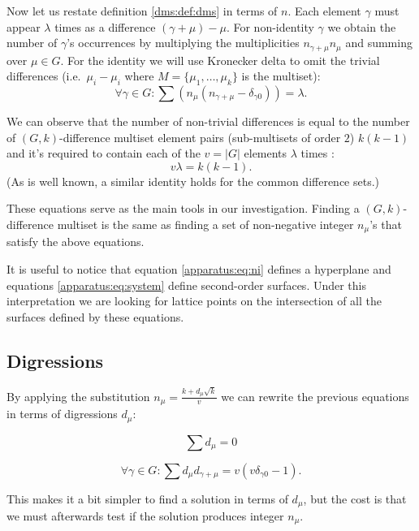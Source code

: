     Now let us restate definition \ref{dms:def:dms} in terms of $n$. Each element $\gamma$ must appear $\lambda$ times as a difference $(\gamma+\mu)-\mu$. For non-identity $\gamma$ we obtain the number of $\gamma$'s occurrences by multiplying the multiplicities $n_{\gamma+\mu} n_\mu$ and summing over $\mu \in G$. For the identity we will use Kronecker delta to omit the trivial differences (i.e.\ $\mu_i-\mu_i$ where $M=\{\mu_1,\ldots,\mu_k\}$ is the multiset):
    \begin{equation}
        \label{apparatus:eq:system}
        \forall \gamma \in G \colon \sum (n_\mu(n_{\gamma+\mu}-\delta_{\gamma0})) = \lambda.
    \end{equation}
    
    We can observe that the number of non-trivial differences is equal to the number of $(G,k)$-difference multiset element pairs (sub-multisets of order $2$) $k(k-1)$ and it's required to contain each of the $v=|G|$ elements $\lambda$ times \cite{buratti1999old}:
    \begin{equation}
        \label{apparatus:eq:parameters}
        v\lambda = k(k-1).
    \end{equation}
(As is well known, a similar identity holds for the common difference sets.)
    
    These equations serve as the main tools in our investigation. Finding a $(G,k)$-difference multiset is the same as finding a set of non-negative integer $n_\mu$'s that satisfy the above equations. 
    
    It is useful to notice that equation \eqref{apparatus:eq:ni} defines a hyperplane and equations \eqref{apparatus:eq:system} define second-order surfaces. Under this interpretation we are looking for lattice points on the intersection of all the surfaces defined by these equations.

\subsection{Digressions}
\label{sec:digressions}
    By applying the substitution $n_\mu=\frac{k+d_\mu \sqrt k}v$ we can rewrite the previous equations in terms of digressions $d_\mu$:
    
    \begin{equation}
        \label{apparatus:eq:di}
        \sum {d_\mu} = 0
    \end{equation}
    
    \begin{equation}
        \label{apparatus:eq:dsystem}
        \forall \gamma \in G \colon \sum d_\mu d_{\gamma+\mu} = v (v \delta_{\gamma0}-1).
    \end{equation}
    
    This makes it a bit simpler to find a solution in terms of $d_\mu$, but the cost is that we must afterwards test if the solution produces integer $n_\mu$.
    
